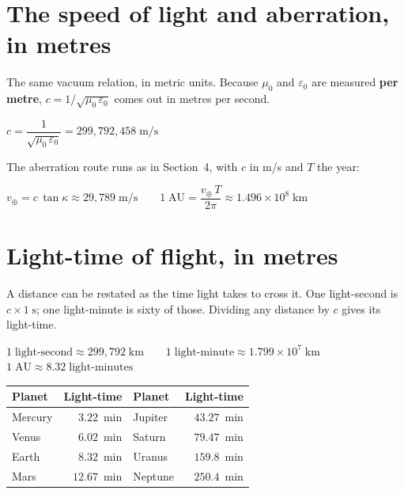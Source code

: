 \documentclass[11pt]{article}
\begin{document}
\section{The speed of light and aberration, in metres}

The same vacuum relation, in metric units. Because $\mu_0$ and
$\varepsilon_0$ are measured \textbf{per metre}, $c = 1/\sqrt{\mu_0\,\varepsilon_0}$
comes out in metres per second.

\begin{tcolorbox}[mathbox]
$c = \dfrac{1}{\sqrt{\mu_0\,\varepsilon_0}} = 299{,}792{,}458\;\text{m/s}$
\end{tcolorbox}

\noindent
The aberration route runs as in Section~4, with $c$ in m/s and $T$ the year:

\begin{tcolorbox}[mathbox]
$v_\oplus = c\,\tan\kappa \approx 29{,}789\;\text{m/s}
\qquad
1\;\text{AU} = \dfrac{v_\oplus\,T}{2\pi} \approx 1.496\times10^{8}\;\text{km}$
\end{tcolorbox}

\section{Light-time of flight, in metres}

A distance can be restated as the time light takes to cross it. One
light-second is $c \times 1\;\text{s}$; one light-minute is sixty of those.
Dividing any distance by $c$ gives its light-time.

\begin{tcolorbox}[mathbox]
$1\;\text{light-second} \approx 299{,}792\;\text{km}
\qquad
1\;\text{light-minute} \approx 1.799\times10^{7}\;\text{km}$
\\[8pt]
$1\;\text{AU} \approx 8.32\;\text{light-minutes}$
\end{tcolorbox}

\begin{center}
\renewcommand{\arraystretch}{1.15}
\begin{tabular}{l r l r}
\textbf{Planet} & \textbf{Light-time} & \textbf{Planet} & \textbf{Light-time}\\
\hline
Mercury & $3.22$~min  & Jupiter & $43.27$~min\\
Venus   & $6.02$~min  & Saturn  & $79.47$~min\\
Earth   & $8.32$~min  & Uranus  & $159.8$~min\\
Mars    & $12.67$~min & Neptune & $250.4$~min\\
\hline
\end{tabular}
\end{center}
\end{document}

